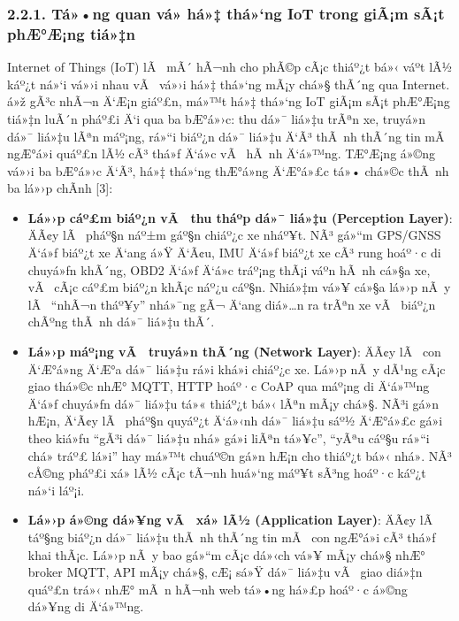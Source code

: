 \documentclass[a4paper]{extarticle}
\providecommand{\tightlist}{%
  \setlength{\itemsep}{0pt}\setlength{\parskip}{0pt}}
\begin{document}
\subsubsection{2.2.1. Tá»•ng quan vá» há»‡ thá»‘ng IoT trong giÃ¡m sÃ¡t phÆ°Æ¡ng
tiá»‡n}\label{221-tux1ed5ng-quan-vux1ec1-hux1ec7-thux1ed1ng-iot-trong-giuxe1m-suxe1t-phux1b0ux1a1ng-tiux1ec7n}

Internet of Things (IoT) lÃ  mÃ´ hÃ¬nh cho phÃ©p cÃ¡c thiáº¿t bá»‹ váº­t lÃ½ káº¿t ná»‘i
vá»›i nhau vÃ  vá»›i há»‡ thá»‘ng mÃ¡y chá»§ thÃ´ng qua Internet. á»ž gÃ³c nhÃ¬n Ä‘Æ¡n giáº£n,
má»™t há»‡ thá»‘ng IoT giÃ¡m sÃ¡t phÆ°Æ¡ng tiá»‡n luÃ´n pháº£i Ä‘i qua ba bÆ°á»›c: thu dá»¯
liá»‡u trÃªn xe, truyá»n dá»¯ liá»‡u lÃªn máº¡ng, rá»“i biáº¿n dá»¯ liá»‡u Ä‘Ã³ thÃ nh thÃ´ng
tin mÃ  ngÆ°á»i quáº£n lÃ½ cÃ³ thá»ƒ Ä‘á»c vÃ  hÃ nh Ä‘á»™ng. TÆ°Æ¡ng á»©ng vá»›i ba bÆ°á»›c Ä‘Ã³,
há»‡ thá»‘ng thÆ°á»ng Ä‘Æ°á»£c tá»• chá»©c thÃ nh ba lá»›p chÃ­nh {[}3{]}:

\begin{itemize}
\tightlist
\item
  \textbf{Lá»›p cáº£m biáº¿n vÃ  thu tháº­p dá»¯ liá»‡u (Perception Layer)}: ÄÃ¢y lÃ 
  pháº§n náº±m gáº§n chiáº¿c xe nháº¥t. NÃ³ gá»“m GPS/GNSS Ä‘á»ƒ biáº¿t xe Ä‘ang á»Ÿ Ä‘Ã¢u, IMU
  Ä‘á»ƒ biáº¿t xe cÃ³ rung hoáº·c di chuyá»ƒn khÃ´ng, OBD2 Ä‘á»ƒ Ä‘á»c tráº¡ng thÃ¡i váº­n
  hÃ nh cá»§a xe, vÃ  cÃ¡c cáº£m biáº¿n khÃ¡c náº¿u cáº§n. Nhiá»‡m vá»¥ cá»§a lá»›p nÃ y lÃ 
  ``nhÃ¬n tháº¥y'' nhá»¯ng gÃ¬ Ä‘ang diá»…n ra trÃªn xe vÃ  biáº¿n chÃºng thÃ nh dá»¯
  liá»‡u thÃ´.
\item
  \textbf{Lá»›p máº¡ng vÃ  truyá»n thÃ´ng (Network Layer)}: ÄÃ¢y lÃ  con Ä‘Æ°á»ng
  Ä‘Æ°a dá»¯ liá»‡u rá»i khá»i chiáº¿c xe. Lá»›p nÃ y dÃ¹ng cÃ¡c giao thá»©c nhÆ° MQTT,
  HTTP hoáº·c CoAP qua máº¡ng di Ä‘á»™ng Ä‘á»ƒ chuyá»ƒn dá»¯ liá»‡u tá»« thiáº¿t bá»‹ lÃªn mÃ¡y
  chá»§. NÃ³i gá»n hÆ¡n, Ä‘Ã¢y lÃ  pháº§n quyáº¿t Ä‘á»‹nh dá»¯ liá»‡u sáº½ Ä‘Æ°á»£c gá»­i theo kiá»ƒu
  ``gÃ³i dá»¯ liá»‡u nhá» gá»­i liÃªn tá»¥c'', ``yÃªu cáº§u rá»“i chá» tráº£ lá»i'' hay má»™t chuáº©n
  gá»n hÆ¡n cho thiáº¿t bá»‹ nhá». NÃ³ cÅ©ng pháº£i xá»­ lÃ½ cÃ¡c tÃ¬nh huá»‘ng máº¥t sÃ³ng
  hoáº·c káº¿t ná»‘i láº¡i.
\item
  \textbf{Lá»›p á»©ng dá»¥ng vÃ  xá»­ lÃ½ (Application Layer)}: ÄÃ¢y lÃ  táº§ng biáº¿n dá»¯
  liá»‡u thÃ nh thÃ´ng tin mÃ  con ngÆ°á»i cÃ³ thá»ƒ khai thÃ¡c. Lá»›p nÃ y bao gá»“m
  cÃ¡c dá»‹ch vá»¥ mÃ¡y chá»§ nhÆ° broker MQTT, API mÃ¡y chá»§, cÆ¡ sá»Ÿ dá»¯ liá»‡u vÃ 
  giao diá»‡n quáº£n trá»‹ nhÆ° mÃ n hÃ¬nh web tá»•ng há»£p hoáº·c á»©ng dá»¥ng di Ä‘á»™ng.
\end{itemize}
\end{document}
